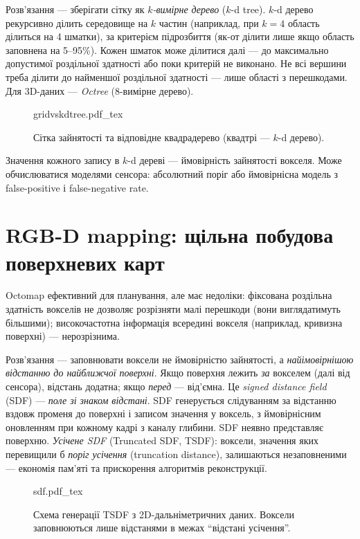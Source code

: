 Розв'язання — зберігати сітку як \emph{$k$-вимірне дерево} ($k$-d tree). $k$-d дерево рекурсивно ділить середовище на $k$ частин (наприклад, при $k=4$ область ділиться на 4 шматки), за критерієм підрозбиття (як-от ділити лише якщо область заповнена на 5--95\%). Кожен шматок може ділитися далі — до максимально допустимої роздільної здатності або поки критерій не виконано. Не всі вершини треба ділити до найменшої роздільної здатності — лише області з перешкодами. Для 3D-даних — \emph{Octree} (8-вимірне дерево).

\begin{figure}
    \centering
    \def\svgwidth{\textwidth}
    {gridvskdtree.pdf_tex}
    \caption{Сітка зайнятості та відповідне квадрадерево (квадтрі — $k$-d дерево).\label{fig:gridvskdtree}}
\end{figure}

Значення кожного запису в $k$-d дереві — ймовірність зайнятості вокселя. Може обчислюватися моделями сенсора: абсолютний поріг або ймовірнісна модель з false-positive і false-negative rate.

\section{RGB-D mapping: щільна побудова поверхневих карт}
Octomap ефективний для планування, але має недоліки: фіксована роздільна здатність вокселів не дозволяє розрізняти малі перешкоди (вони виглядатимуть більшими); високочастотна інформація всередині вокселя (наприклад, кривизна поверхні) — нерозрізнима.

Розв'язання — заповнювати воксели не ймовірністю зайнятості, а \emph{найімовірнішою відстанню до найближчої поверхні}. Якщо поверхня лежить \emph{за} вокселем (далі від сенсора), відстань додатна; якщо \emph{перед} — від'ємна. Це \emph{signed distance field} (SDF) — \emph{поле зі знаком відстані}. SDF генерується слідуванням за відстанню вздовж променя до поверхні і записом значення у воксель, з ймовірнісним оновленням при кожному кадрі з каналу глибини. SDF неявно представляє поверхню. \emph{Усічене SDF} (Truncated SDF, TSDF): воксели, значення яких перевищили б \emph{поріг усічення} (truncation distance), залишаються незаповненими — економія пам'яті та прискорення алгоритмів реконструкції.

\begin{figure}
    \centering
    \def\svgwidth{0.8\textwidth}
    {sdf.pdf_tex}
    \caption{Схема генерації TSDF з 2D-дальніметричних даних. Воксели заповнюються лише відстанями в межах ``відстані усічення''.\label{fig:sdf}}
\end{figure}

